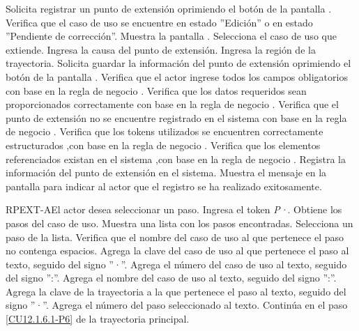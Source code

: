 	\begin{UCtrayectoria}
		\UCpaso[\UCactor] Solicita registrar un punto de extensión oprimiendo el botón  de la pantalla .
		\UCpaso[\UCactor] Verifica que el caso de uso se encuentre en estado ''Edición'' o en estado ''Pendiente de corrección''. 
		\UCpaso[\UCsist] Muestra la pantalla .
		\UCpaso[\UCactor] Selecciona el caso de uso que extiende. \label{CU12.1.6.1-P4}
		\UCpaso[\UCactor] Ingresa la causa del punto de extensión.
		\UCpaso[\UCsist] Ingresa la región de la trayectoria.  \label{CU12.1.6.1-P6}
		\UCpaso[\UCactor] Solicita guardar la información del punto de extensión oprimiendo el botón  de la pantalla .  
		\UCpaso[\UCsist] Verifica que el actor ingrese todos los campos obligatorios con base en la regla de negocio . 
		\UCpaso[\UCsist] Verifica que los datos requeridos sean proporcionados correctamente con base en la regla de negocio .   
		\UCpaso[\UCsist] Verifica que el punto de extensión no se encuentre registrado en el sistema con base en la regla de negocio .  
		\UCpaso[\UCsist] Verifica que los tokens utilizados se encuentren correctamente estructurados ,con base en la regla de negocio . 
		\UCpaso[\UCsist] Verifica que los elementos referenciados existan en el sistema ,con base en la regla de negocio . 
		\UCpaso[\UCsist] Registra la información del punto de extensión en el sistema.
		\UCpaso[\UCsist] Muestra el mensaje  en la pantalla  para indicar al actor que el registro se ha realizado exitosamente.
	\end{UCtrayectoria}		
	
	\begin{UCtrayectoriaA}{RPEXT-A}{El actor desea seleccionar un paso.}
		\UCpaso[\UCactor] Ingresa el token {\em P·}. 
		\UCpaso[\UCsist] Obtiene los pasos del caso de uso.
		\UCpaso[\UCsist] Muestra una lista con los pasos encontradas.
		\UCpaso[\UCactor] Selecciona un paso de la lista.
		\UCpaso[\UCsist] Verifica que el nombre del caso de uso al que pertenece el paso no contenga espacios. 
		\UCpaso[\UCsist] Agrega la clave del caso de uso al que pertenece el paso al texto, seguido del signo ''·''.
		\UCpaso[\UCsist] Agrega el número del caso de uso al texto, seguido del signo '':''.
		\UCpaso[\UCsist] Agrega el nombre del caso de uso al texto, seguido del signo '':''.
		\UCpaso[\UCsist] Agrega la clave de la trayectoria a la que pertenece el paso al texto, seguido del signo ''·''.
		\UCpaso[\UCsist] Agrega el número del paso seleccionado al texto.
		\UCpaso Continúa en el paso \ref{CU12.1.6.1-P6} de la trayectoria principal.
	\end{UCtrayectoriaA}

